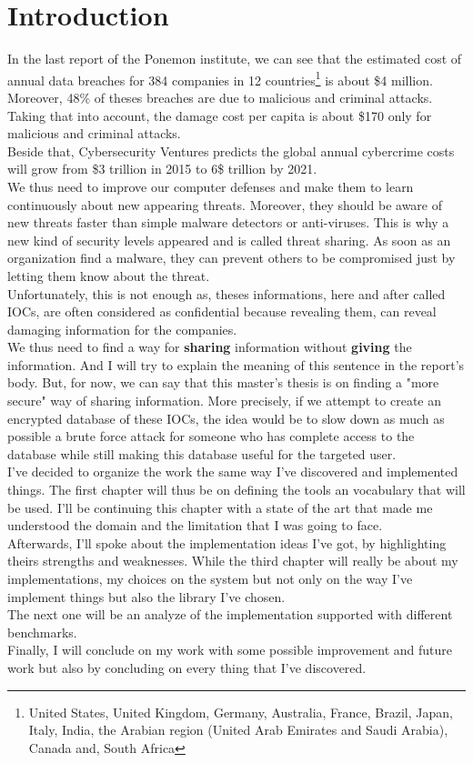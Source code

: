 \documentclass{eplmastersthesis}
\begin{document}
\section{Introduction}
In the last report of the Ponemon institute, we can see that the estimated cost of annual data breaches for 384 companies in 12 countries\footnote{United States, United Kingdom, Germany, Australia, France, Brazil, Japan, Italy, India, the Arabian region (United Arab Emirates and Saudi Arabia), Canada and, South Africa} is about \$4 million. Moreover, 48\% of theses breaches are due to malicious and criminal attacks.\\
Taking that into account, the damage cost per capita is about \$170 only for malicious and criminal attacks. \\
Beside that, Cybersecurity Ventures predicts the global annual cybercrime costs will grow from \$3 trillion in 2015 to 6\$ trillion by 2021.\\

We thus need to improve our computer defenses and make them to learn continuously about new appearing threats. Moreover, they should be aware of new threats faster than simple malware detectors or anti-viruses. This is why a new kind of security levels appeared and is called threat sharing. As soon as an organization find a malware, they can prevent others to be compromised just by letting them know about the threat. \\
Unfortunately, this is not enough as, theses informations, here and after called IOCs, are often considered as confidential because revealing them, can reveal damaging information for the companies.\\
We thus need to find a way for \textbf{sharing} information without \textbf{giving} the information. And I will try to explain the meaning of this sentence in the report's body. But, for now, we can say that this master's thesis is on finding a "more secure" way of sharing information. More precisely, if we attempt to create an encrypted database of these IOCs, the idea would be to slow down as much as possible a brute force attack for someone who has complete access to the database while still making this database useful for the targeted user.\\

I've decided to organize the work the same way I've discovered and implemented things. The first chapter will thus be on defining the tools an vocabulary that will be used. I'll be continuing this chapter with a state of the art that made me understood the domain and the limitation that I was going to face.\\
Afterwards, I'll spoke about the implementation ideas I've got, by highlighting theirs strengths and weaknesses. While the third chapter will really be about my implementations, my choices on the system but not only on the way I've implement things but also the library I've chosen.\\
The next one will be an analyze of the implementation supported with different benchmarks.\\
Finally, I will conclude on my work with some possible improvement and future work but also by concluding on every thing that I've discovered.
\end{document}
